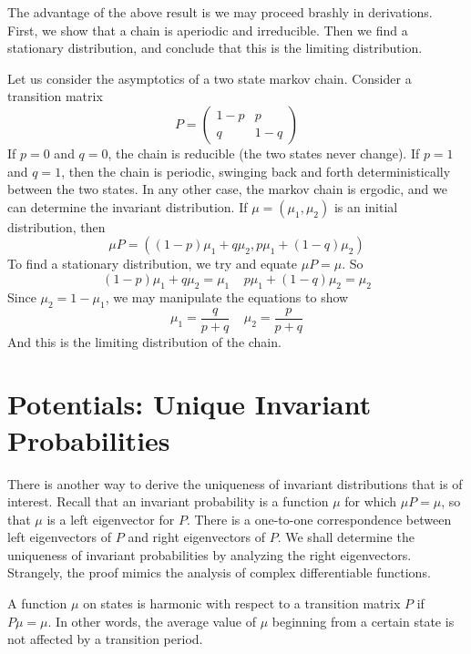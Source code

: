The advantage of the above result is we may proceed brashly in derivations. First, we show that a chain is aperiodic and irreducible. Then we find a stationary distribution, and conclude that this is the limiting distribution.

\begin{example}
    Let us consider the asymptotics of a two state markov chain. Consider a transition matrix
    \[ P = \begin{pmatrix} 1-p & p \\ q & 1-q \end{pmatrix} \]
    If $p = 0$ and $q = 0$, the chain is reducible (the two states never change). If $p = 1$ and $q = 1$, then the chain is periodic, swinging back and forth deterministically between the two states. In any other case, the markov chain is ergodic, and we can determine the invariant distribution. If $\mu = (\mu_1, \mu_2)$ is an initial distribution, then
    \[ \mu P = ((1-p)\mu_1 + q\mu_2, p\mu_1 + (1-q)\mu_2) \]
    To find a stationary distribution, we try and equate $\mu P = \mu$. So
    \[ (1-p)\mu_1 + q\mu_2 = \mu_1\ \ \ \ \ p\mu_1 + (1-q)\mu_2 = \mu_2 \]
    Since $\mu_2 = 1 - \mu_1$, we may manipulate the equations to show
    \[ \mu_1 = \frac{q}{p + q} \ \ \ \ \ \mu_2 = \frac{p}{p+q} \]
    And this is the limiting distribution of the chain.
\end{example}

\section{Potentials: Unique Invariant Probabilities}

There is another way to derive the uniqueness of invariant distributions that is of interest. Recall that an invariant probability is a function $\mu$ for which $\mu P = \mu$, so that $\mu$ is a left eigenvector for $P$. There is a one-to-one correspondence between left eigenvectors of $P$ and right eigenvectors of $P$. We shall determine the uniqueness of invariant probabilities by analyzing the right eigenvectors. Strangely, the proof mimics the analysis of complex differentiable functions.

\begin{definition}
    A function $\mu$ on states is harmonic with respect to a transition matrix $P$ if $P\mu = \mu$. In other words, the average value of $\mu$ beginning from a certain state is not affected by a transition period.
\end{definition}


